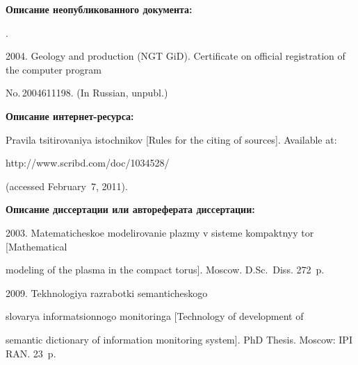 {{\begin{enumerate}[1.]
{%





\vspace*{-3pt}





\noindent


\textbf{Описание неопубликованного документа:}





.


2004. Geology and production (NGT GiD). Certificate on official registration of the computer program


No.\,2004611198. (In Russian, unpubl.)





\noindent


\textbf{Описание интернет-ресурса:}








Pravila tsitirovaniya istochnikov [Rules for the citing of sources]. Available at: {\sf


http://www.scribd.com/doc/1034528/} (accessed February~7, 2011).










\noindent


\textbf{Описание диссертации или автореферата диссертации:}







2003. Matematicheskoe modelirovanie plazmy v sisteme kompaktnyy tor [Mathematical


modeling of the plasma in the compact torus].  Moscow. D.Sc.\ Diss. 272~p.





 2009. Tekhnologiya razrabotki semanticheskogo


slovarya informatsionnogo monitoringa [Technology of development of


semantic dictionary of information monitoring system]. PhD Thesis. Moscow: IPI RAN. 23~p.








}
\end{enumerate}}}
